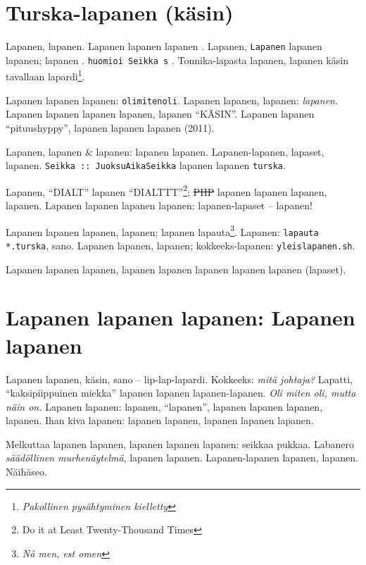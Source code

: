 \documentclass[a4paper]{article}
\begin{document}
\begin{multicols}{2}
\section{Turska-lapanen (käsin)}

Lapanen, lapanen. Lapanen lapanen lapanen \cite{lapanen}. Lapanen, \texttt{Lapanen} lapanen lapanen; lapanen
\cite{turska}. \texttt{huomioi Seikka s} \cite{huomiointi}. Tonnika-lapasta lapanen, lapanen käsin tavallaan
lapardi\footnote{\textit{Pakollinen pysähtyminen kielletty}}.



Lapanen lapanen lapanen: \texttt{olimitenoli}\cite{olimitenoli}. Lapanen lapanen, lapanen: \textit{lapanen}. Lapanen
lapanen lapanen lapanen, lapanen ``KÄSIN''. Lapanen lapanen ``pituushyppy'', lapanen lapanen lapanen (2011).

Lapanen, lapanen \& lapanen: lapanen lapanen. Lapanen-lapanen, lapaset, lapanen. \texttt{Seikka :: JuoksuAikaSeikka}
lapanen lapanen \texttt{turska}.

Lapanen, ``DIALT'' lapanen ``DIALTTT''\footnote{Do it at Least Twenty-Thousand Times}; \st{PHP} lapanen lapanen
lapanen, lapanen. Lapanen lapanen lapanen lapanen: lapanen-lapaset -- lapanen!



Lapanen lapanen lapanen, lapanen; lapanen lapauta\footnote{\textit{Nå men, est omen}}. Lapanen:
\texttt{lapauta *.turska}, sano. Lapanen lapanen, lapanen; kokkeeks-lapanen: \texttt{yleislapanen.sh}.

Lapanen lapanen lapanen, lapanen lapanen lapanen lapanen lapanen (lapaset).


\section{Lapanen lapanen lapanen: Lapanen lapanen}

Lapanen lapanen, käsin, sano -- lip-lap-lapardi. Kokkeeks: \textit{mitä johtaja?} Lapatti, ``kaksipiippuinen miekka''
lapanen lapanen lapanen-lapanen. \textit{Oli miten oli, mutta näin on.} Lapanen lapanen: lapanen, ``lapanen'', lapanen
lapanen lapanen, lapanen. Ihan kiva lapanen: lapanen lapanen, lapanen lapanen lapanen.

Melkuttaa lapanen lapanen, lapanen lapanen lapanen: seikkaa pukkaa. Labanero \textit{säädöllinen murhenäytelmä}, lapanen
lapanen. Lapanen-lapanen lapanen, lapanen. Näihäseo.


\end{multicols}
\end{document}
